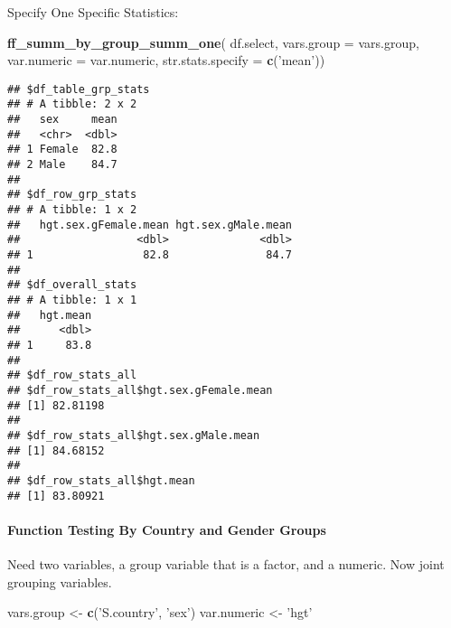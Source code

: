 \documentclass[
]{book}
\newenvironment{Shaded}{\begin{snugshade}}{\end{snugshade}}
\newcommand{\DataTypeTok}[1]{\textcolor[rgb]{0.13,0.29,0.53}{#1}}
\newcommand{\KeywordTok}[1]{\textcolor[rgb]{0.13,0.29,0.53}{\textbf{#1}}}
\newcommand{\NormalTok}[1]{#1}
\newcommand{\OperatorTok}[1]{\textcolor[rgb]{0.81,0.36,0.00}{\textbf{#1}}}
\newcommand{\StringTok}[1]{\textcolor[rgb]{0.31,0.60,0.02}{#1}}
\begin{document}
Specify One Specific Statistics:

\begin{Shaded}
\begin{Highlighting}[]
\KeywordTok{ff_summ_by_group_summ_one}\NormalTok{(}
\NormalTok{  df.select, }\DataTypeTok{vars.group =}\NormalTok{ vars.group, }\DataTypeTok{var.numeric =}\NormalTok{ var.numeric, }
  \DataTypeTok{str.stats.specify =} \KeywordTok{c}\NormalTok{(}\StringTok{'mean'}\NormalTok{))}
\end{Highlighting}
\end{Shaded}

\begin{verbatim}
## $df_table_grp_stats
## # A tibble: 2 x 2
##   sex     mean
##   <chr>  <dbl>
## 1 Female  82.8
## 2 Male    84.7
## 
## $df_row_grp_stats
## # A tibble: 1 x 2
##   hgt.sex.gFemale.mean hgt.sex.gMale.mean
##                  <dbl>              <dbl>
## 1                 82.8               84.7
## 
## $df_overall_stats
## # A tibble: 1 x 1
##   hgt.mean
##      <dbl>
## 1     83.8
## 
## $df_row_stats_all
## $df_row_stats_all$hgt.sex.gFemale.mean
## [1] 82.81198
## 
## $df_row_stats_all$hgt.sex.gMale.mean
## [1] 84.68152
## 
## $df_row_stats_all$hgt.mean
## [1] 83.80921
\end{verbatim}

\hypertarget{function-testing-by-country-and-gender-groups}{%
\paragraph{Function Testing By Country and Gender Groups}\label{function-testing-by-country-and-gender-groups}}

Need two variables, a group variable that is a factor, and a numeric. Now joint grouping variables.

\begin{Shaded}
\begin{Highlighting}[]
\NormalTok{vars.group <-}\StringTok{ }\KeywordTok{c}\NormalTok{(}\StringTok{'S.country'}\NormalTok{, }\StringTok{'sex'}\NormalTok{)}
\NormalTok{var.numeric <-}\StringTok{ 'hgt'}
\end{Highlighting}
\end{Shaded}

\begin{Shaded}
\end{Shaded}
\end{document}
